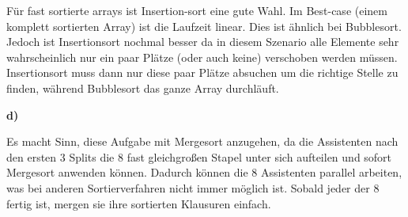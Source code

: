 \documentclass[a4paper,graphics,11pt]{article}
\begin{document}
Für fast sortierte arrays ist Insertion-sort eine gute Wahl. Im Best-case (einem komplett sortierten Array)
ist die Laufzeit linear. Dies ist ähnlich bei Bubblesort. Jedoch ist Insertionsort nochmal besser da
in diesem Szenario alle Elemente sehr wahrscheinlich nur ein paar Plätze (oder auch keine) verschoben werden
müssen. Insertionsort muss dann nur diese paar Plätze absuchen um die richtige Stelle zu finden, während Bubblesort
das ganze Array durchläuft.

\textbf{d)}

Es macht Sinn, diese Aufgabe mit Mergesort anzugehen, da die Assistenten nach den ersten 3 Splits die 8 fast gleichgroßen
Stapel unter sich aufteilen und sofort Mergesort anwenden können. Dadurch können die 8 Assistenten parallel arbeiten,
was bei anderen Sortierverfahren nicht immer möglich ist. Sobald jeder der 8 fertig ist, mergen sie ihre sortierten Klausuren
einfach.
\end{document}
